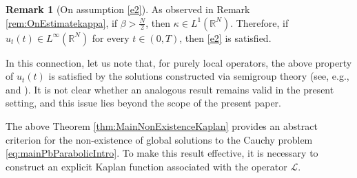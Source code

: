 \documentclass[11pt,a4paper,reqno]{amsart}
\def \LL {\mathcal{L}}
\theoremstyle{definition}
\newtheorem{remark}[definition]{Remark}
\theoremstyle{plain}
\numberwithin{equation}{section}
\begin{document}
\begin{remark}[On assumption \eqref{e2}]\label{timeder}
As observed in Remark \ref{rem:OnEstimatekappa}, if
$\beta>\frac{N}{2}$, then $\kappa\in L^1(\mathbb{R}^N)$. Therefore,
if $u_t(t)\in L^\infty(\mathbb{R}^N)$ for every $t\in(0,T)$, then
\eqref{e2} is satisfied.

In this connection, let us note that, for purely local operators,
the above property of $u_t(t)$ is satisfied by the solutions
constructed via semigroup theory
(see, e.g., \cite[Propositions 7.1.10 and 7.3.1]{Lun}
and \cite[Remark1]{Pu2}). It is not clear whether an analogous
result remains valid in the present setting, and this issue lies
beyond the scope of the present paper.
\end{remark}



The above Theorem \ref{thm:MainNonExistenceKaplan} provides an abstract criterion for the non-existence of global solutions to the Cauchy problem \eqref{eq:mainPbParabolicIntro}.
To make this result effective, it is necessary to construct an explicit Kaplan function associated with the operator $\LL$.
\vspace{0.1cm}
\end{document}
